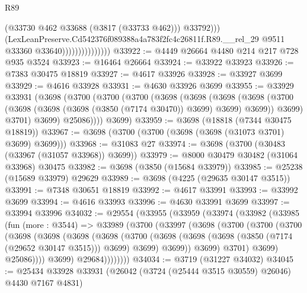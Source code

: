 \begin{lexlean}{R89}
\begin{coremodule}
                                      (@33730 @462 @33688 (@3817 (@33733 @462)))
                                      @33792)))
                                (LexLeanPreserve.Cd542376f089388a4a783f2fc4c26811f.R89.__rel_29
                                  @9511
                                  @33360
                                  @33640)))))))))))))))
@33922 := @4449 @26664 @4480 @214 @217 @728 @935 @3524
@33923 := @16464 @26664
@33924 := @33922 @33923
@33926 := @7383 @30475 @18819
@33927 := @4617 @33926
@33928 := @33927 @3699
@33929 := @4616 @33928
@33931 := @4630 @33926 @3699
@33955 := @33929
    @33931
    (@3698
      (@3700
        (@3700
          (@3700
            (@3698
              (@3698
                (@3698
                  (@3698
                    (@3700 (@3698 (@3698 (@3698 (@3850 (@7174 @30470)) @3699) @3699) @3699))
                    @3699)
                  @3701)
                @3699)
              @25086))))
      @3699)
@33959 := @3698 (@18818 (@7344 @30475 @18819))
@33967 := @3698 (@3700 (@3700 (@3698 (@3698 (@31073 @3701) @3699) @3699)))
@33968 := @31083 @27
@33974 := @3698 (@3700 (@30483 (@33967 (@31057 @33968)) @3699))
@33979 := @8000 @30479 @30482 (@31064 @33968) @30475
@33982 := @3698 (@3850 (@15684 @33979))
@33985 := @25238 (@15689 @33979) @29629
@33989 := @3698 (@4225 (@29635 @30147 @3515))
@33991 := @7348 @30651 @18819
@33992 := @4617 @33991
@33993 := @33992 @3699
@33994 := @4616 @33993
@33996 := @4630 @33991 @3699
@33997 := @33994 @33996
@34032 := @29554
    (@33955
      (@33959
        (@33974
          (@33982
            (@33985
              (fun (more : @3544) =>
              @33989
                (@3700
                  (@33997
                    (@3698
                      (@3700
                        (@3700
                          (@3700
                            (@3698
                              (@3698
                                (@3698
                                  (@3698
                                    (@3700
                                      (@3698
                                        (@3698
                                          (@3698 (@3850 (@7174 (@29652 @30147 @3515))) @3699)
                                          @3699)
                                        @3699))
                                    @3699)
                                  @3701)
                                @3699)
                              @25086))))
                      @3699)
                    @29684))))))))
@34034 := @3719 (@31227 @34032)
@34045 := @25434 @33928 @33931 (@26042 (@3724 (@25444 @3515 @30559) @26046) @4430 @7167 @4831)

\end{coremodule}
\end{lexlean}
